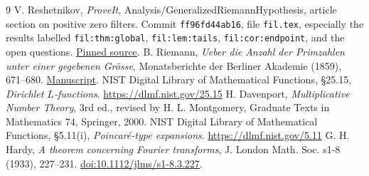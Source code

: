 \documentclass[11pt,letterpaper]{article}
\begin{document}
\begin{thebibliography}{9}
 V. Reshetnikov, \emph{ProveIt}, Analysis/GeneralizedRiemannHypothesis, article section on positive zero filters. Commit \texttt{ff96fd44ab16}, file \texttt{fil.tex}, especially the results labelled \texttt{fil:thm:global}, \texttt{fil:lem:tails}, \texttt{fil:cor:endpoint}, and the open questions. \href{https://github.com/VladimirReshetnikov/ProveIt/blob/ff96fd44ab160e65fb8a9d861243828d07c156cf/Analysis/GeneralizedRiemannHypothesis/Article/sections/fil.tex}{Pinned source}.
 B. Riemann, \emph{Ueber die Anzahl der Primzahlen unter einer gegebenen Gr\"osse}, Monatsberichte der Berliner Akademie (1859), 671--680. \href{https://www.claymath.org/collections/riemanns-1859-manuscript/}{Manuscript}.
 NIST Digital Library of Mathematical Functions, \S25.15, \emph{Dirichlet $L$-functions}. \url{https://dlmf.nist.gov/25.15}
 H. Davenport, \emph{Multiplicative Number Theory}, 3rd ed., revised by H. L. Montgomery, Graduate Texts in Mathematics 74, Springer, 2000.
 NIST Digital Library of Mathematical Functions, \S5.11(i), \emph{Poincar\'e-type expansions}. \url{https://dlmf.nist.gov/5.11}
 G. H. Hardy, \emph{A theorem concerning Fourier transforms}, J. London Math. Soc. s1-8 (1933), 227--231. \href{https://doi.org/10.1112/jlms/s1-8.3.227}{doi:10.1112/jlms/s1-8.3.227}.
\end{thebibliography}
\end{document}
